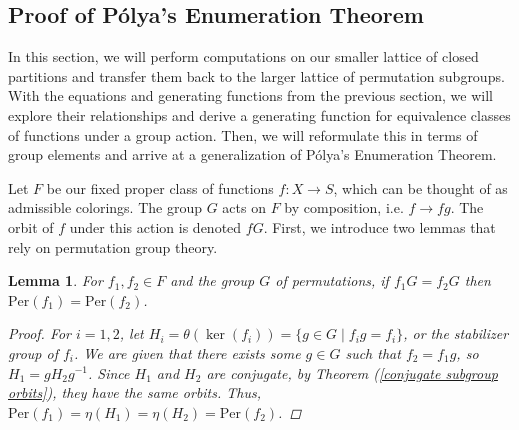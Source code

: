 \documentclass[psamsfonts]{amsart}
\newtheorem{lem}[thm]{Lemma}
\theoremstyle{definition}
\theoremstyle{remark}
\numberwithin{equation}{section}
\begin{document}
\subsection{Proof of P\'{o}lya's Enumeration Theorem}\hfill

In this section, we will perform computations on our smaller lattice of closed partitions and transfer them back to the larger lattice of permutation subgroups. With the equations and generating functions from the previous section, we will explore their relationships and derive a generating function for equivalence classes of functions under a group action. Then, we will reformulate this in terms of group elements and arrive at a generalization of P\'{o}lya's Enumeration Theorem.

Let $F$ be our fixed proper class of functions $f:X\to S$, which can be thought of as admissible colorings. The group $G$ acts on $F$ by composition, i.e. $f\to fg$. The orbit of $f$ under this action is denoted $fG$. First, we introduce two lemmas that rely on permutation group theory.
\begin{lem}\label{lemma 1}
For $f_1,f_2\in F$ and the group $G$ of permutations, if $f_1G=f_2G$ then $\text{Per}(f_1)=\text{Per}(f_2)$.
\begin{proof}
For $i=1,2$, let $H_i=\theta(\ker(f_i))=\{g\in G\mid f_ig=f_i\}$, or the stabilizer group of $f_i$. We are given that there exists some $g\in G$ such that $f_2=f_1g$, so $H_1=gH_2g^{-1}$. Since $H_1$ and $H_2$ are conjugate, by Theorem (\ref{conjugate subgroup orbits}), they have the same orbits. Thus, $\text{Per}(f_1)=\eta(H_1)=\eta(H_2)=\text{Per}(f_2)$.
\end{proof}
\end{lem}
\end{document}
